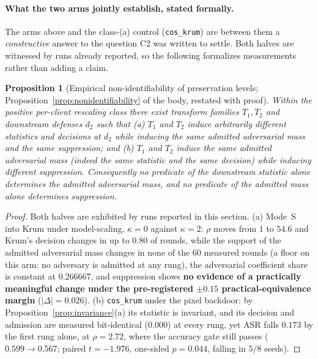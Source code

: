 \documentclass{article}
\newtheorem{proposition}[theorem]{Proposition}
\begin{document}
\paragraph{What the two arms jointly establish, stated formally.} The arms above and the class-(a) control (\texttt{cos\_krum}) are between them a \emph{constructive} answer to the question C2 was written to settle. Both halves are witnessed by runs already reported, so the following formalizes measurements rather than adding a claim.

\begin{proposition}[Empirical non-identifiability of preservation levels; Proposition~\ref{prop:nonidentifiability} of the body, restated with proof]
\label{prop:nonidentifiability_full}
Within the positive per-client rescaling class there exist transform families $T_1,T_2$ and downstream defenses $d_2$ such that
(a) $T_1$ and $T_2$ induce arbitrarily different statistics and \emph{decisions} at $d_2$ while inducing the \emph{same} admitted adversarial mass and the same suppression; and
(b) $T_1$ and $T_2$ induce the \emph{same} admitted adversarial mass (indeed the same statistic and the same decision) while inducing \emph{different} suppression.
Consequently no predicate of the downstream statistic alone determines the admitted adversarial mass, and no predicate of the admitted mass alone determines suppression.
\end{proposition}
\begin{proof}
Both halves are exhibited by runs reported in this section. (a) Mode~S into Krum under model-scaling, $\kappa{=}0$ against $\kappa{=}2$: $\rho$ moves from $1$ to $54.6$ and Krum's decision changes in up to $0.80$ of rounds, while the support of the admitted adversarial mass changes in none of the $60$ measured rounds (a floor on this arm: no adversary is admitted at any rung), the adversarial coefficient share is constant at $0.266667$, and suppression shows \textbf{no evidence of a practically meaningful change under the pre-registered $\pm0.15$ practical-equivalence margin} ($|\Delta|{=}0.026$). (b) \texttt{cos\_krum} under the pixel backdoor: by Proposition~\ref{prop:invariance}(a) its statistic is invariant, and its decision and admission are measured bit-identical ($0.000$) at every rung, yet ASR falls $0.173$ by the first rung alone, at $\rho{=}2.72$, where the accuracy gate still passes ($0.599 \to 0.567$; paired $t{=}{-}1.976$, one-sided $p{=}0.044$, falling in $5/8$ seeds).
\end{proof}
\end{document}
